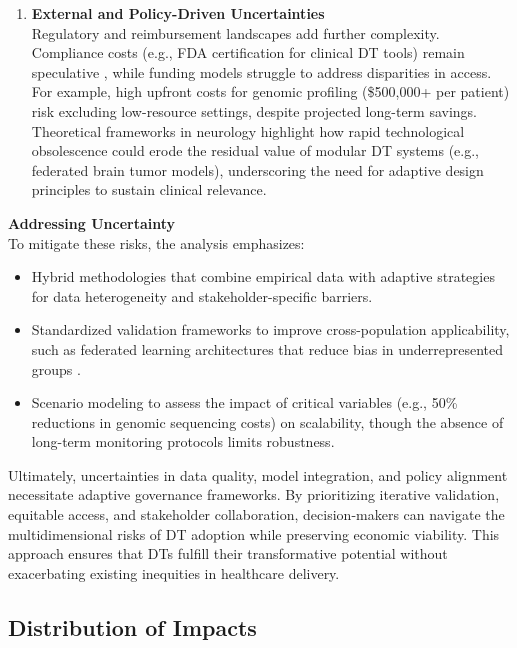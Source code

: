 \documentclass[10pt,a4paper]{article}
\begin{document}
\begin{enumerate}
    \item \textbf{External and Policy-Driven Uncertainties} \\
    Regulatory and reimbursement landscapes add further complexity. Compliance costs (e.g., FDA certification for clinical DT tools) remain speculative \cite{Wang2025, Bocean2025}, while funding models struggle to address disparities in access. For example, high upfront costs for genomic profiling (\$500,000+ per patient) \cite{Wang2025} risk excluding low-resource settings, despite projected long-term savings. Theoretical frameworks in neurology highlight how rapid technological obsolescence could erode the residual value of modular DT systems (e.g., federated brain tumor models), underscoring the need for adaptive design principles to sustain clinical relevance.
\end{enumerate}

\textbf{Addressing Uncertainty} \\
To mitigate these risks, the analysis emphasizes:

\begin{itemize}
    \item Hybrid methodologies that combine empirical data with adaptive strategies for data heterogeneity and stakeholder-specific barriers.
    \item Standardized validation frameworks to improve cross-population applicability, such as federated learning architectures that reduce bias in underrepresented groups \cite{Wang2025, Bocean2025}.
    \item Scenario modeling to assess the impact of critical variables (e.g., 50\% reductions in genomic sequencing costs) on scalability, though the absence of long-term monitoring protocols \cite{Boverhof2024} limits robustness.
\end{itemize}

Ultimately, uncertainties in data quality, model integration, and policy alignment necessitate adaptive governance frameworks. By prioritizing iterative validation, equitable access, and stakeholder collaboration, decision-makers can navigate the multidimensional risks of DT adoption while preserving economic viability. This approach ensures that DTs fulfill their transformative potential without exacerbating existing inequities in healthcare delivery.


\subsection*{Distribution of Impacts}
\end{document}
